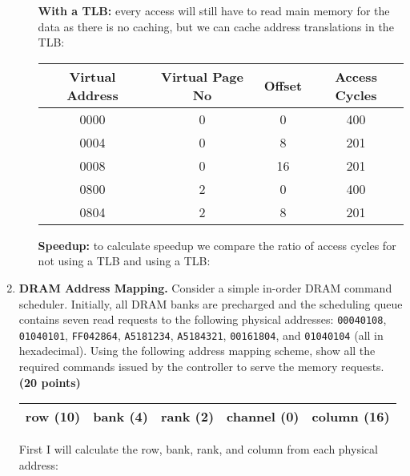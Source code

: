 \documentclass[a4paper, 11pt]{exam}
\begin{document}
\begin{enumerate}
\begin{enumerate}

	\textbf{With a TLB:} every access will still have to read main memory for the data as there is no caching, but we can cache address translations in the TLB:
	
	\begin{center}
	\begin{tabular}{ |c|c|c|c| } 
		\hline
		\textbf{Virtual Address}& \textbf{Virtual Page No} & \textbf{Offset} & \textbf{Access Cycles} \\ 
		\hline
		0000 & 0 & 0 & 400\\ \hline
		0004 & 0 & 8 & 201 \\ \hline
		0008 & 0 & 16 & 201 \\ \hline
		0800 & 2 & 0 & 400\\ \hline
		0804 & 2& 8 & 201 \\ \hline
	\end{tabular}
	\end{center}
	
	
	\textbf{Speedup:} to calculate speedup we compare the ratio of access cycles for not using a TLB and using a TLB:
	
\end{enumerate}






\item \textbf {DRAM Address Mapping.}
Consider a simple in-order DRAM command scheduler.
Initially, all DRAM banks are precharged and the scheduling queue contains seven read requests to the following physical addresses: 
\texttt{00040108},
\texttt{01040101},
\texttt{FF042864},
\texttt{A5181234},
\texttt{A5184321},
\texttt{00161804}, and
\texttt{01040104}
(all in hexadecimal).
Using the following address mapping scheme, show all the required commands issued by the controller to serve the memory requests.
\textbf{(20 points)}

\begin{center}
	\begin{tabular}{|c|c|c|c|c|}
		\hline
		row (10)&bank (4)&rank (2)&channel (0)&column (16) \\
		\hline
	\end{tabular}
\end{center}

First I will calculate the row, bank, rank, and column from each physical address:



\end{enumerate}
\end{document}
